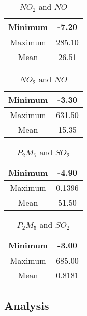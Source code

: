 \documentclass{article}
\begin{document}
	\begin{table}[h]
		\centering
		\begin{minipage}{.5\textwidth}
			\centering
			\begin{tabular}{|c|c|}
				\hline
				Minimum & -7.20 \\
				\hline
				Maximum & 285.10 \\
				\hline
				Mean & 26.51 \\
				\hline
			\end{tabular}
			\caption{$NO_2$ and $NO$}
			\label{table_no2}
		\end{minipage}%
		\begin{minipage}{.5\textwidth}
			\centering
			\begin{tabular}{|c|c|}
				\hline
				Minimum & -3.30 \\
				\hline
				Maximum & 631.50 \\
				\hline
				Mean & 15.35 \\
				\hline
			\end{tabular}
			\label{table_no}
		\end{minipage}
	\end{table}
	
		\begin{table}[h]
		\centering
		\begin{minipage}{.5\textwidth}
			\centering
			\begin{tabular}{|c|c|}
				\hline
				Minimum & -4.90 \\
				\hline
				Maximum & 0.1396 \\
				\hline
				Mean & 51.50 \\
				\hline
			\end{tabular}
			\caption{$P_2M_5$ and $SO_2$}
			\label{table_no2}
		\end{minipage}%
		\begin{minipage}{.5\textwidth}
			\centering
			\begin{tabular}{|c|c|}
				\hline
				Minimum & -3.00 \\
				\hline
				Maximum & 685.00 \\
				\hline
				Mean & 0.8181 \\
				\hline
			\end{tabular}
			\label{table_pm2_5}
		\end{minipage}
	\end{table}
	
	
	
	\newpage
	\subsection{Analysis}
	
\end{document}
